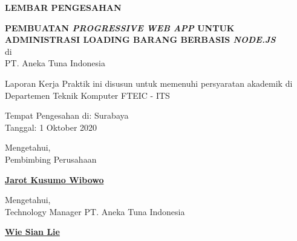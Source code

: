\begin{center}
  {\Large \textbf{LEMBAR PENGESAHAN}}
  \vspace{4ex}


  {\large \textbf{PEMBUATAN \emph{PROGRESSIVE WEB APP} UNTUK ADMINISTRASI LOADING BARANG BERBASIS \emph{NODE.JS}}} \\
  di \\
  PT. Aneka Tuna Indonesia
  \vspace{4ex}

  Laporan Kerja Praktik ini disusun untuk memenuhi persyaratan akademik di Departemen Teknik Komputer FTEIC - ITS
  \vspace{2ex}

  Tempat Pengesahan di: Surabaya \\
  Tanggal: 1 Oktober 2020
  \vspace{8ex}

  Mengetahui, \\
  Pembimbing Perusahaan
  \vspace{12ex}

  \textbf{\underline{Jarot Kusumo Wibowo}}
  \vspace{8ex}

  Mengetahui, \\
  Technology Manager PT. Aneka Tuna Indonesia
  \vspace{12ex}

  \textbf{\underline{Wie Sian Lie}}

\end{center}